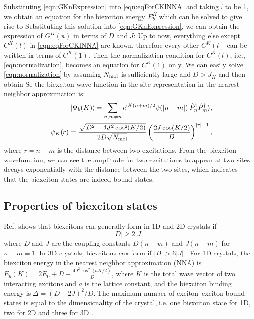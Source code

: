 Substituting \autoref{eqn:GKnExpression} into \autoref{eqn:eqForCKlNNA} and taking $l$ to be 1, we obtain an 
equation for the biexciton energy $E^{K}_{b}$ which can be solved to give rise to
Substituting this solution into \autoref{eqn:GKnExpression}, we can obtain the expression of $G^{K}(n)$ in terms of
$D$ and $J$:
Up to now, everything else except $C^{K}(l)$ in \autoref{eqn:eqForCKlNNA} are known, therefore every other
 $C^{K}(l)$ can be written in terms of $C^{K}(1)$. Then the normalization condition for $C^{K}(l)$, i.e., 
 \autoref{eqn:normalization}, becomes an equation for $C^{K}(1)$ only. We can easily solve
 \autoref{eqn:normalization} by assuming $N_{\rm mol}$ is sufficiently large and $D > J_{K}$ and then obtain
So the biexciton wave function in the site representation in the nearest neighbor approximation is:
\begin{eqnarray}
&&| \Psi_b(K) \rangle = \sum\limits_{n,m \neq n} e^{iK(n+m)/2}
\psi(|n-m|) | \hat P_n^\dag \hat P_m^\dag \rangle , \nonumber \\
&&\psi_{K}(r) = \frac{\sqrt{D^2 - 4 J^2\cos^2 (K/2)}}{2D \sqrt{N_{\rm  mol}}} \left(
\frac{2 J\cos(K/2)}{D} \right)^{|r|-1} , \nonumber
\end{eqnarray}
where $r=n-m$ is the distance between two excitations. From the biexciton wavefunction, we can see the amplitude
for two excitations to appear at two sites decays exponentially with the distance between the two sites, which
 indicates that the biexciton states are indeed bound states. 


\subsection{Properties of biexciton states}
\label{sec:propertiesBiexciton}

Ref. \cite{vektaris} shows that biexcitons can generally form in 1D and 2D crystals if
\begin{equation}\label{biexc-formation}
|D| \geq 2 |J|
\end{equation}
where $D$ and $J$ are the coupling constants $D(n-m)$ and $J(n-m)$ for $n-m =1$. In 3D crystals, biexcitons can form
 if $|D| > 6 |J|$ \cite{biexciton-theory-2}. For 1D crystals, the biexciton energy in the nearest neighbor approximation
 (NNA) is $E_b(K) = 2E_0 + D + \frac{4 J^2 \cos^2(aK/2)}{D}$, where $K$ is the total wave vector of two interacting
 excitons and $a$ is the lattice constant, and the biexciton binding energy is $\Delta = (D - 2J)^2/D$. The maximum
 number of exciton--exciton bound states is equal to the dimensionality of the crystal, i.e. one biexciton state for 1D,
 two for 2D and three for 3D \cite{vektaris,note1}. 

